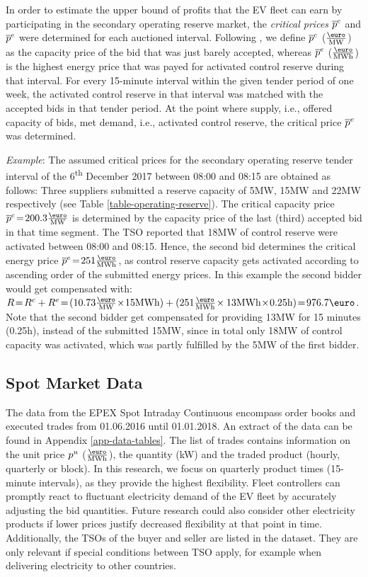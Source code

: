 \documentclass[a4paper, 12pt]{article}
\let\textcite\shortciteA
\begin{document}
In order to estimate the upper bound of profits that the EV fleet can earn by
participating in the secondary operating reserve market, the \emph{critical prices}
\(\overline p^c_{}\) and \(\overline p^e_{}\) were determined for each auctioned interval. Following
\textcite{brandt17_evaluat_busin_model_vehic_grid_integ}, we define \(\overline p^c_{}\)
(\(\emw\)) as the capacity price of the bid that was just barely
accepted, whereas \(\overline p^e_{}\) (\(\emwh\)) is the highest energy price
that was payed for activated control reserve during that interval. For every
15-minute interval within the given tender period of one week, the activated
control reserve in that interval was matched with the accepted bids in that
tender period. At the point where supply, i.e., offered capacity of bids, met
demand, i.e., activated control reserve, the critical price \(\overline p^e_{}\) was
determined.

\emph{Example}: The assumed critical prices for the secondary operating reserve
tender interval of the 6\textsuperscript{th} December 2017 between 08:00 and 08:15 are obtained
as follows: Three suppliers submitted a reserve capacity of 5MW, 15MW and 22MW
respectively (see Table \ref{table-operating-reserve}). The critical capacity
price \(\ccp{}\!=\!200.3\emw\) is determined by the capacity price of the last
(third) accepted bid in that time segment. The TSO reported that 18MW of control
reserve were activated between 08:00 and 08:15. Hence, the second bid determines
the critical energy price \(\cep{}\!=\!251\emwh\), as control reserve capacity
gets activated according to ascending order of the submitted energy prices. In
this example the second bidder would get compensated with:
\(R\!=\!R^c + R^e\!=\!(10.73\emw\!\times\!15\mw) +
(251\emwh\!\times13\mw\!\times\!0.25\text{h})\!=\! 976.7\eur\). Note that
the second bidder get compensated for providing 13MW for 15 minutes (0.25h),
instead of the submitted 15MW, since in total only 18MW of control capacity was
activated, which was partly fulfilled by the 5MW of the first bidder.

\subsection{Spot Market Data \label{sec-data-intraday}}
\label{sec:org55efbd4}
The data from the EPEX Spot Intraday Continuous encompass order books and
executed trades from 01.06.2016 until 01.01.2018. An extract of the data can be
found in Appendix \ref{app-data-tables}. The list of trades contains information
on the unit price \(p^u_{}\) (\(\emwh\)), the quantity (kW) and the traded product
(hourly, quarterly or block). In this research, we focus on quarterly product
times (15-minute intervals), as they provide the highest flexibility. Fleet
controllers can promptly react to fluctuant electricity demand of the EV fleet
by accurately adjusting the bid quantities. Future research could also consider
other electricity products if lower prices justify decreased flexibility at that
point in time. Additionally, the TSOs of the buyer and seller are listed in the
dataset. They are only relevant if special conditions between TSO apply, for
example when delivering electricity to other countries.
\end{document}
